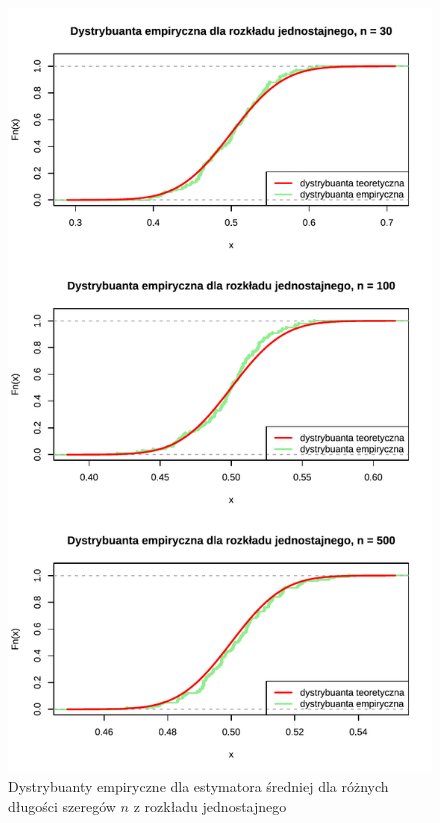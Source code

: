 \documentclass[10pt, a4paper]{article}\usepackage[]{graphicx}\usepackage[]{xcolor}
\makeatletter
\def\maxwidth{ %
  \ifdim\Gin@nat@width>\linewidth
    \linewidth
  \else
    \Gin@nat@width
  \fi
}
\newenvironment{knitrout}{}{} %
\makeatother
\begin{document}
\begin{knitrout}
\color{fgcolor}\begin{figure}[H]

{\centering \includegraphics[width=\maxwidth]{figure/analiza-sredniej-unif-dystr-emp-1} 

}

\caption[Dystrybuanty empiryczne dla estymatora średniej dla różnych długości szeregów $n$ z rozkładu jednostajnego]{Dystrybuanty empiryczne dla estymatora średniej dla różnych długości szeregów $n$ z rozkładu jednostajnego}\label{fig:analiza-sredniej-unif-dystr-emp}
\end{figure}

\end{knitrout}
\end{document}
